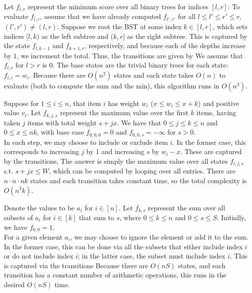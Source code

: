 \documentclass{article}
\begin{document}
\maketitle
  
  Let $f_{l,r}$ represent the minimum score over all binary trees for indices $[l,r]$:
  To evaluate $f_{l,r}$, assume that we have already computed $f_{l',r'}$ for all $l\leq l'\leq r'\leq r$, $(l',r')\neq (l,r)$. Suppose we root the BST at some index $k\in [l,r]$, which sets indices $[l,k)$ as the left subtree and $(k,r]$ as the right subtree. This is captured by the state $f_{l,k-1}$ and $f_{k+1,r}$, respectively, and because each of the depths increase by $1$, we increment the total. Thus, the transitions are given by
  We assume that $f_{l,r}$ for $l>r$ is $0$. The base states are the trivial binary trees for each state: $f_{i,i}=w_i$. Because there are $O(n^2)$ states and each state takes $O(n)$ to evaluate (both to compute the sum and the min), this algorithm runs in $O(n^3)$.

  Suppose for $1\leq i\leq n$, that item $i$ has weight $w_i$ ($x\leq w_i\leq x+k$) and positive value $v_i$. Let $f_{k,j,s}$ represent the maximum value over the first $k$ items, having taken $j$ items with total weight $s+jx$. We have that $0\leq j\leq k\leq n$ and $0\leq x\leq nk$, with base case $f_{0,0,0}=0$ and $f_{0,0,s}=-\infty$ for $s> 0$. \\
  
  In each step, we may choose to include or exclude item $i$. In the former case, this corresponds to increasing $j$ by $1$ and increasing $s$ by $w_i-x$. These are captured by the transitions,
The answer is simply the maximum value over all states $f_{i,j,s}$ s.t. $s+jx\leq W$, which can be computed by looping over all entries. There are $n\cdot n\cdot nk$ states and each transition takes constant time, so the total complexity is $O(n^3k)$. 

  Denote the values to be $a_i$ for $i\in [n]$. Let $f_{k,s}$ represent the sum over all subsets of $a_i$ for $i\in [k]$ that sum to $s$, where $0\leq k\leq n$ and $0\leq s\leq S$. Initially, we have $f_{0,0}=1$. \\

  For a given element $a_i$, we may choose to ignore the element or add it to the sum. In the former case, this can be done via all the subsets that either include index $i$ or do not include index $i$; in the latter case, the subset must include index $i$. This is captured via the transitions
  Because there are $O(nS)$ states, and each transition has a constant number of arithmetic operations, this runs in the desired $O(nS)$ time.
\end{document}
